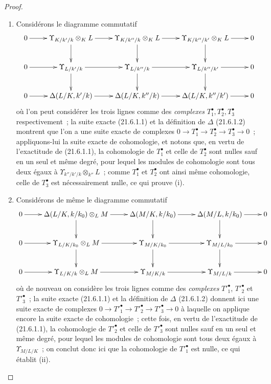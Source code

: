 \begin{proof}
\begin{enumerate}
  \item[(i)] Considérons le diagramme commutatif
\[
\xymatrix{
0\ar[r]&\Upsilon_{K/k'/k}\otimes_KL\ar[r]\ar[d]&
\Upsilon_{K/k''/k}\otimes_KL\ar[r]\ar[d]&
\Upsilon_{K/k''/k'}\otimes_KL\ar[r]\ar[d]&0\\
0\ar[r]&\Upsilon_{L/k'/k}\ar[r]\ar[d]&
\Upsilon_{L/k''/k}\ar[r]\ar[d]&
\Upsilon_{L/k''/k'}\ar[r]\ar[d]&0\\
0\ar[r]&\Delta(L/K,k'/k)\ar[r]&\Delta(L/K,k''/k)\ar[r]&
\Delta(L/K,k''/k')\ar[r]&0
}
\]
où l'on peut considérer les trois lignes comme des \emph{complexes}
$T^\bullet_1,T^\bullet_2,T^\bullet_3$ respectivement~; la suite exacte (21.6.1.1) et la définition
de $\Delta$ (21.6.1.2) montrent que l'on a une suite exacte de complexes
$0\to T^\bullet_1\to T^\bullet_2\to T^\bullet_3\to0$~; appliquons-lui la suite exacte de
cohomologie, et notons que, en vertu de l'exactitude de (21.6.1.1), la
cohomologie de $T^\bullet_1$ et celle de $T^\bullet_2$ sont nulles sauf en un seul et même
degré, pour lequel les modules de cohomologie sont tous deux égaux à
$\Upsilon_{k''/k'/k}\otimes_{k''}L$~; comme $T^\bullet_1$ et $T^\bullet_2$ ont ainsi même
cohomologie, celle de $T^\bullet_3$ est nécessairement nulle, ce qui prouve (i).
  \item[(ii)] Considérons de même le diagramme commutatif
\[
\xymatrix{
0\ar[r]&\Delta(L/K,k/k_0)\otimes_LM\ar[r]\ar[d]&
\Delta(M/K,k/k_0)\ar[r]\ar[d]&\Delta(M/L,k/k_0)\ar[r]\ar[d]&0\\
0\ar[r]&\Upsilon_{L/K/k_0}\otimes_LM\ar[r]\ar[d]&
\Upsilon_{M/K/k_0}\ar[r]\ar[d]&\Upsilon_{M/L/k_0}\ar[r]\ar[d]&0\\
0\ar[r]&\Upsilon_{L/K/k}\otimes_LM\ar[r]&
\Upsilon_{M/K/k}\ar[r]&\Upsilon_{M/L/k}\ar[r]&0
}
\]
où de nouveau on considère les trois lignes comme des \emph{complexes}
$T'^\bullet_1$, $T'^\bullet_2$ et $T'^\bullet_3$~; la suite exacte (21.6.1.1) et la définition de $\Delta$
(21.6.1.2) donnent ici une suite exacte de complexes
$0\to T'^\bullet_1\to T'^\bullet_2\to T'^\bullet_3\to0$ à laquelle on applique encore la suite exacte
de cohomologie~; cette fois, en vertu de l'exactitude de (21.6.1.1), la
cohomologie de $T'^\bullet_2$ et celle de $T'^\bullet_3$ sont nulles sauf en un seul et même
degré, pour lequel les modules de cohomologie sont tous deux égaux à
$\Upsilon_{M/L/K}$~; on conclut donc ici que la cohomologie de $T'^\bullet_1$ est
nulle, ce qui établit (ii).
\end{enumerate}
\end{proof}

